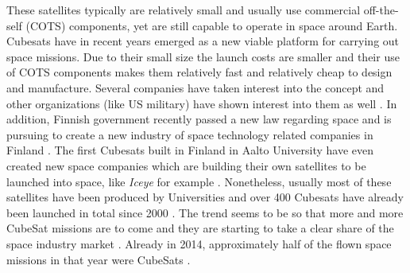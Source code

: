 \documentclass[english,12pt,a4paper,pdftex,elec,utf8]{aaltothesis}
\begin{document}
These satellites typically are relatively small and usually use commercial off-the-self (COTS) components, yet are still capable to operate in space around Earth. Cubesats have in recent years emerged as a new viable platform for carrying out space missions. Due to their small size the launch costs are smaller and their use of COTS components makes them relatively fast and relatively cheap to design and manufacture.  Several companies have taken interest into the concept and other organizations (like US military) have shown interest into them as well \cite{cds}. In addition, Finnish government recently passed a new law regarding space and is pursuing to create a new industry of space technology related companies in Finland \cite{filaw}. The first Cubesats built in Finland in Aalto University have even created new space companies which are building their own satellites to be launched into space, like \textit{Iceye} for example  \cite{iceye}. Nonetheless, usually most of these satellites have been produced by Universities and over 400 Cubesats have already been launched in total since 2000 \cite{Swart2016}. The trend seems to be so that more and more CubeSat missions are to come and they are starting to take a clear share of the space industry market \cite{SpaceWorks2017}. Already in 2014, approximately half of the flown space missions in that year were CubeSats \cite{Swart2016}.\par 
\end{document}
